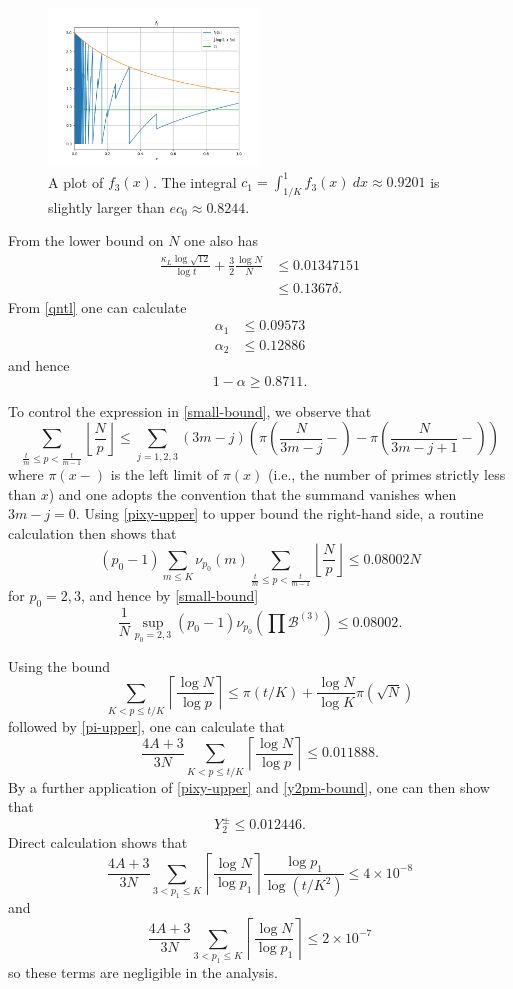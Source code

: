 \documentclass[12pt,a4paper,reqno]{amsart}
\numberwithin{equation}{section}
\theoremstyle{plain}
\theoremstyle{definition}
\newcommand\tuple{{\mathcal B}}
\begin{document}
\begin{figure}
  \centering
  \includegraphics[width=0.5\textwidth]{discrepancy.png}
  \caption{A plot of $f_3(x)$.  The integral $c_1 = \int_{1/K}^1 f_3(x)\ dx \approx 0.9201$ is slightly larger than $ec_0 \approx 0.8244$.}
  \label{fig-f}
  \end{figure}

From the lower bound on $N$ one also has
\begin{align*}
  \frac{\kappa_L \log \sqrt{12}}{\log t} + \frac{3}{2} \frac{\log N}{N} &\leq 0.01347151 \\
  &\leq 0.1367 \delta.
\end{align*}
From \eqref{qntl} one can calculate
\begin{align*}
  \alpha_1 &\leq 0.09573 \\
  \alpha_2 &\leq 0.12886
\end{align*}
and hence
$$ 1-\alpha \geq 0.8711.$$

To control the expression in \eqref{small-bound}, we observe that
\begin{equation}\label{tm}
   \sum_{\frac{t}{m} \leq p < \frac{t}{m-1}} \left\lfloor \frac{N}{p} \right\rfloor \leq \sum_{j=1,2,3} (3m-j) \left(\pi\left(\frac{N}{3m-j}-\right) - \pi\left(\frac{N}{3m-j+1}-\right)\right)
\end{equation}
where $\pi(x-)$ is the left limit of $\pi(x)$ (i.e., the number of primes strictly less than $x$) and one adopts the convention that the summand vanishes when $3m-j=0$.  Using \eqref{pixy-upper} to upper bound the right-hand side, a routine calculation then shows that
$$ (p_0-1) \sum_{m \leq K} \nu_{p_0}(m) \sum_{\frac{t}{m} \leq p < \frac{t}{m-1}} \left\lfloor \frac{N}{p} \right\rfloor \leq 0.08002N$$
for $p_0=2,3$,
and hence by \eqref{small-bound}
$$ \frac{1}{N} \sup_{p_0=2,3} (p_0-1) \nu_{p_0}\left( \prod \tuple^{(3)}\right) \leq 0.08002.$$

Using the bound
$$ \sum_{K < p \leq t/K} \left\lceil \frac{\log N}{\log p} \right\rceil \leq \pi(t/K) + \frac{\log N}{\log K} \pi(\sqrt{N})$$
followed by \eqref{pi-upper}, one can calculate that
$$ \frac{4A+3}{3N} \sum_{K < p \leq t/K} \left\lceil \frac{\log N}{\log p}\right\rceil \leq 0.011888.$$
By a further application of \eqref{pixy-upper} and \eqref{y2pm-bound}, one can then show that
$$ Y^\pm_2 \leq 0.012446.$$
Direct calculation shows that
$$ \frac{4A+3}{3N} \sum_{3 < p_1 \leq K} \left\lceil \frac{\log N}{\log p_1} \right\rceil \frac{\log p_1}{\log(t/K^2)} \leq 4 \times 10^{-8}$$
and
$$ \frac{4A+3}{3N} \sum_{3 < p_1 \leq K} \left\lceil \frac{\log N}{\log p_1} \right\rceil \leq 2 \times 10^{-7}$$
so these terms are negligible in the analysis. 
\end{document}
